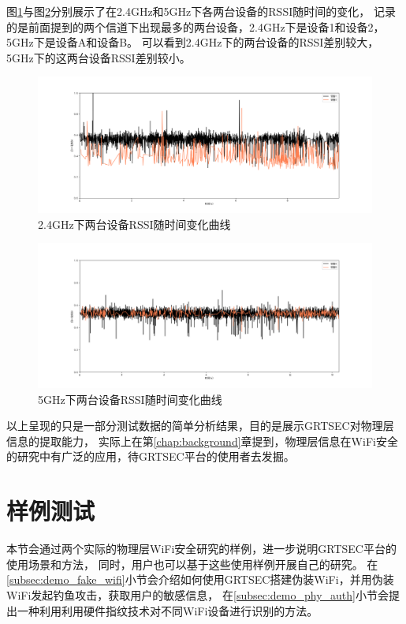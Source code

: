     图\ref{fig:envaluation_rssi_2_4g}与图\ref{fig:envaluation_rssi_5g}分别展示了在2.4GHz和5GHz下各两台设备的RSSI随时间的变化，
    记录的是前面提到的两个信道下出现最多的两台设备，2.4GHz下是设备1和设备2，5GHz下是设备A和设备B。
    可以看到2.4GHz下的两台设备的RSSI差别较大，5GHz下的这两台设备RSSI差别较小。
  		\begin{figure}[H]
  			\centering
  			\includegraphics[width=1.0\textwidth]{img/envaluation_rssi_2_4g.png}
  			\caption{2.4GHz下两台设备RSSI随时间变化曲线}
  			\label{fig:envaluation_rssi_2_4g}
  		\end{figure}

  		\begin{figure}[H]
  			\centering
  			\includegraphics[width=1.0\textwidth]{img/envaluation_rssi_5g.png}
  			\caption{5GHz下两台设备RSSI随时间变化曲线}
  			\label{fig:envaluation_rssi_5g}
  		\end{figure}

    以上呈现的只是一部分测试数据的简单分析结果，目的是展示GRTSEC对物理层信息的提取能力，
    实际上在第\ref{chap:background}章提到，物理层信息在WiFi安全的研究中有广泛的应用，待GRTSEC平台的使用者去发掘。

  \section{样例测试}\label{sec:envaluation_demo}
	本节会通过两个实际的物理层WiFi安全研究的样例，进一步说明GRTSEC平台的使用场景和方法，
	同时，用户也可以基于这些使用样例开展自己的研究。
	在\ref{subsec:demo_fake_wifi}小节会介绍如何使用GRTSEC搭建伪装WiFi，并用伪装WiFi发起钓鱼攻击，获取用户的敏感信息，
	在\ref{subsec:demo_phy_auth}小节会提出一种利用利用硬件指纹技术对不同WiFi设备进行识别的方法。

